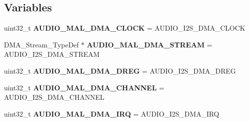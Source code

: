 \subsection*{Variables}
\begin{DoxyCompactItemize}
\item 
\hypertarget{group___s_t_m32_f4___d_i_s_c_o_v_e_r_y___a_u_d_i_o___c_o_d_e_c___private___functions_gad38097642bd111020f5e35ed9fc91da7}{uint32\-\_\-t {\bfseries A\-U\-D\-I\-O\-\_\-\-M\-A\-L\-\_\-\-D\-M\-A\-\_\-\-C\-L\-O\-C\-K} = A\-U\-D\-I\-O\-\_\-\-I2\-S\-\_\-\-D\-M\-A\-\_\-\-C\-L\-O\-C\-K}\label{group___s_t_m32_f4___d_i_s_c_o_v_e_r_y___a_u_d_i_o___c_o_d_e_c___private___functions_gad38097642bd111020f5e35ed9fc91da7}

\item 
\hypertarget{group___s_t_m32_f4___d_i_s_c_o_v_e_r_y___a_u_d_i_o___c_o_d_e_c___private___functions_gaf5b0640851ff20bf597c8189303353e9}{D\-M\-A\-\_\-\-Stream\-\_\-\-Type\-Def $\ast$ {\bfseries A\-U\-D\-I\-O\-\_\-\-M\-A\-L\-\_\-\-D\-M\-A\-\_\-\-S\-T\-R\-E\-A\-M} = A\-U\-D\-I\-O\-\_\-\-I2\-S\-\_\-\-D\-M\-A\-\_\-\-S\-T\-R\-E\-A\-M}\label{group___s_t_m32_f4___d_i_s_c_o_v_e_r_y___a_u_d_i_o___c_o_d_e_c___private___functions_gaf5b0640851ff20bf597c8189303353e9}

\item 
\hypertarget{group___s_t_m32_f4___d_i_s_c_o_v_e_r_y___a_u_d_i_o___c_o_d_e_c___private___functions_gae5825de7e48b6421756552975162dedf}{uint32\-\_\-t {\bfseries A\-U\-D\-I\-O\-\_\-\-M\-A\-L\-\_\-\-D\-M\-A\-\_\-\-D\-R\-E\-G} = A\-U\-D\-I\-O\-\_\-\-I2\-S\-\_\-\-D\-M\-A\-\_\-\-D\-R\-E\-G}\label{group___s_t_m32_f4___d_i_s_c_o_v_e_r_y___a_u_d_i_o___c_o_d_e_c___private___functions_gae5825de7e48b6421756552975162dedf}

\item 
\hypertarget{group___s_t_m32_f4___d_i_s_c_o_v_e_r_y___a_u_d_i_o___c_o_d_e_c___private___functions_ga99a5a310256f2c98a213038502e7760f}{uint32\-\_\-t {\bfseries A\-U\-D\-I\-O\-\_\-\-M\-A\-L\-\_\-\-D\-M\-A\-\_\-\-C\-H\-A\-N\-N\-E\-L} = A\-U\-D\-I\-O\-\_\-\-I2\-S\-\_\-\-D\-M\-A\-\_\-\-C\-H\-A\-N\-N\-E\-L}\label{group___s_t_m32_f4___d_i_s_c_o_v_e_r_y___a_u_d_i_o___c_o_d_e_c___private___functions_ga99a5a310256f2c98a213038502e7760f}

\item 
\hypertarget{group___s_t_m32_f4___d_i_s_c_o_v_e_r_y___a_u_d_i_o___c_o_d_e_c___private___functions_gaf11d236f838a8c38bd096245894af1db}{uint32\-\_\-t {\bfseries A\-U\-D\-I\-O\-\_\-\-M\-A\-L\-\_\-\-D\-M\-A\-\_\-\-I\-R\-Q} = A\-U\-D\-I\-O\-\_\-\-I2\-S\-\_\-\-D\-M\-A\-\_\-\-I\-R\-Q}\label{group___s_t_m32_f4___d_i_s_c_o_v_e_r_y___a_u_d_i_o___c_o_d_e_c___private___functions_gaf11d236f838a8c38bd096245894af1db}


\end{DoxyCompactItemize}
